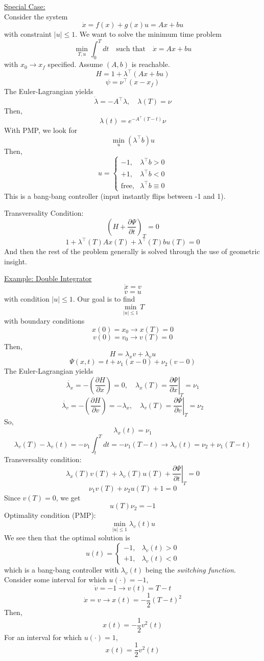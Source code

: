 \documentclass{article}
\begin{document}
\noindent
\underline{Special Case:}\\[2mm]
Consider the system
\[\dot{x} = f(x) + g(x)u = Ax + bu\]
with constraint $|u| \le 1$. We want to solve the minimum time problem
\[\min_{T,u}\int_{0}^{T}dt \quad \text{such that} \quad \dot{x} = Ax + bu\]
with $x_0 \rightarrow x_f$ specified. Assume $(A,b)$ is reachable.
\[H = 1 + \lambda^\top(Ax + bu)\]
\[\psi = \nu^\top (x-x_f)\]
The Euler-Lagrangian yields
\[\dot{\lambda} = -A^\top \lambda, \quad \lambda(T) = \nu\]
Then,
\[\lambda(t) = e^{-A^\top(T-t)}\nu\]
With PMP, we look for
\[\min_{u}(\lambda^\top b)u\]
Then,
\[u = \begin{cases}
    -1, & \lambda^\top b > 0 \\
    +1, & \lambda^\top b < 0 \\
    \text{free}, & \lambda^\top b \equiv 0
\end{cases}\]
This is a bang-bang controller (input instantly flips between -1 and 1).

\noindent
Transversality Condition:
\[\left(H + \frac{\partial\Psi}{\partial t}\right)_{T} = 0\]
\[1 + \lambda^\top(T)Ax(T) + \lambda^\top(T)bu(T) = 0\]
And then the rest of the problem generally is solved through the use of geometric insight.

\noindent
\underline{Example: Double Integrator}
\[\dot{x} = v\]
\[\dot{v} = u\]
with condition $|u| \le 1$. Our goal is to find
\[\min_{|u| \le 1}T\]
with boundary conditions
\[x(0) = x_0 \rightarrow x(T) = 0\]
\[v(0) = v_0 \rightarrow v(T) = 0\]
Then,
\[H = \lambda_x v + \lambda_v u\]
\[\Psi(x,t) = t + \nu_1(x-0) + \nu_2(v-0)\]
The Euler-Lagrangian yields
\[\dot{\lambda_x} = -\left(\frac{\partial H}{\partial x}\right) = 0,
\quad \lambda_x(T) = \left.\frac{\partial\Psi}{\partial x}\right|_{T} = \nu_1\]
\[\dot{\lambda_v} = -\left(\frac{\partial H}{\partial v}\right) = -\lambda_x,
\quad \lambda_v(T) = \left.\frac{\partial\Psi}{\partial v}\right|_{T} = \nu_2\]
So,
\[\lambda_x(t) = \nu_1\]
\[\lambda_v(T)-\lambda_v(t) = -\nu_1\int_{t}^{T}dt = -\nu_1(T-t)
\rightarrow \lambda_v(t) = \nu_2 + \nu_1(T-t)\]
Transversality condition:
\[\lambda_x(T)v(T) + \lambda_v(T)u(T) + \left.\frac{\partial\Psi}{\partial t}\right|_{T} = 0\]
\[\nu_1 v(T) + \nu_2 u(T) + 1 = 0\]
Since $v(T) = 0$, we get
\[u(T)\nu_2 = -1\]
Optimality condition (PMP):
\[\min_{|u| \le 1}\lambda_v(t) u\]
We see then that the optimal solution is
\[u(t) = \begin{cases}
    -1, & \lambda_v(t) > 0 \\
    +1, & \lambda_v(t) < 0
\end{cases}\]
which is a bang-bang controller with $\lambda_v(t)$ being the \textit{switching function}.
\noindent
Consider some interval for which $u(\cdot) = -1$,
\[\dot{v} = -1 \rightarrow v(t) = T-t\]
\[\dot{x} = v \rightarrow x(t) = -\frac{1}{2}(T-t)^2\]
Then,
\[x(t) = -\frac{1}{2}v^2(t)\]
For an interval for which $u(\cdot) = 1$,
\[x(t) = \frac{1}{2}v^2(t)\]
\end{document}
